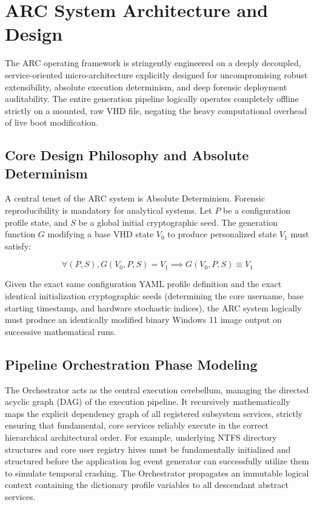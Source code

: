 \documentclass{ieeeaccess}
\begin{document}
\section{ARC System Architecture and Design}

The ARC operating framework is stringently engineered on a deeply decoupled, service-oriented micro-architecture explicitly designed for uncompromising robust extensibility, absolute execution determinism, and deep forensic deployment auditability. The entire generation pipeline logically operates completely offline strictly on a mounted, raw VHD file, negating the heavy computational overhead of live boot modification.

\subsection{Core Design Philosophy and Absolute Determinism}
A central tenet of the ARC system is Absolute Determinism. Forensic reproducibility is mandatory for analytical systems. Let $P$ be a configuration profile state, and $S$ be a global initial cryptographic seed. The generation function $G$ modifying a base VHD state $V_0$ to produce personalized state $V_1$ must satisfy:

\begin{equation}
\forall (P, S), G(V_0, P, S) = V_1 \implies G(V_0, P, S) \equiv V_1
\end{equation}

Given the exact same configuration YAML profile definition and the exact identical initialization cryptographic seeds (determining the core username, base starting timestamp, and hardware stochastic indices), the ARC system logically must produce an identically modified binary Windows 11 image output on successive mathematical runs.

\subsection{Pipeline Orchestration Phase Modeling}
The Orchestrator acts as the central execution cerebellum, managing the directed acyclic graph (DAG) of the execution pipeline. It recursively mathematically maps the explicit dependency graph of all registered subsystem services, strictly ensuring that fundamental, core services reliably execute in the correct hierarchical architectural order. For example, underlying NTFS directory structures and core user registry hives must be fundamentally initialized and structured before the application log event generator can successfully utilize them to simulate temporal crashing. The Orchestrator propagates an immutable logical context containing the dictionary profile variables to all descendant abstract services.
\end{document}
